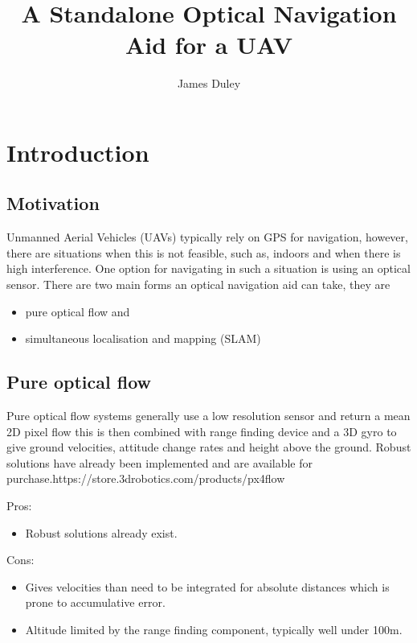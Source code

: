 \documentclass[a4paper,12pt]{article}
\begin{document}
\title{A Standalone Optical Navigation Aid for a UAV}
\author{James Duley}
\maketitle
\thispagestyle{empty}
\newpage

\tableofcontents
\newpage


\section{Introduction}
\subsection{Motivation\label{motivation}}
Unmanned Aerial Vehicles (UAVs) typically rely on GPS for navigation, however, there are situations when this is not feasible, such as, indoors and when there is high interference. One option for navigating in such a situation is using an optical sensor. There are two main forms an optical navigation aid can take, they are
\begin{itemize}
	\item pure optical flow and
	\item simultaneous localisation and mapping (SLAM)
\end{itemize}

\subsection{Pure optical flow}
Pure optical flow systems generally use a low resolution sensor and return a mean 2D pixel flow this is then combined with range finding device and a 3D gyro to give ground velocities, attitude change rates and height above the ground. Robust solutions have already been implemented and are available for purchase\cite{pixflow}.https://store.3drobotics.com/products/px4flow

Pros:
\begin{itemize}
	\item Robust solutions already exist.
\end{itemize}
Cons:
\begin{itemize}
	\item Gives velocities than need to be integrated for absolute distances which is prone to accumulative error.
	\item Altitude limited by the range finding component, typically well under 100m.
\end{itemize}
\end{document}

